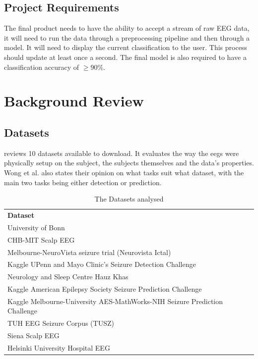 \documentclass[12pt]{article}
\begin{document}
\subsection{Project Requirements}


The final product needs to have the ability to accept a stream of raw EEG data, it will need to run the data through a preprocessing pipeline and then through a model. It will need to display the current classification to the user. This process should update at least once a second. The final model is also required to have a classification accuracy of $\geq90\%$. 


\section{Background Review}

\subsection{Datasets}

\cite{wong2023eeg} reviews 10 datasets available to download. It evaluates the way the \acrshort{eegs} were physically setup on the subject, the subjects themselves and the data's properties. Wong et al. also states their opinion on what tasks suit what dataset, with the main two tasks being either detection or prediction. 

\begin{table}[H]
\centering
\begin{tabular}{l}
\textbf{Dataset}                       \\
University of Bonn                   \\
CHB-MIT Scalp EEG                    \\
Melbourne-NeuroVista seizure trial (Neurovista Ictal)                           \\
Kaggle UPenn and Mayo Clinic's Seizure Detection Challenge                     \\
Neurology and Sleep Centre Hauz Khas \\
Kaggle American Epilepsy Society Seizure Prediction Challenge                  \\
Kaggle Melbourne-University AES-MathWorks-NIH Seizure Prediction Challenge \\
TUH EEG Seizure Corpus (TUSZ)        \\
Siena Scalp EEG                      \\
Helsinki University Hospital EEG    
\end{tabular}
\caption{The Datasets analysed}
\end{table}
\end{document}
